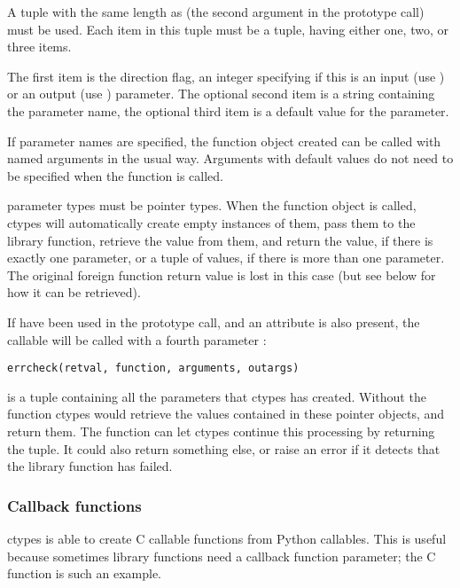 A tuple with the same length as  (the second argument in
the prototype call) must be used.  Each item in this tuple must be a
tuple, having either one, two, or three items.

The first item is the direction flag, an integer specifying if this is
an input (use ) or an output (use ) parameter.  The optional
second item is a string containing the parameter name, the optional
third item is a default value for the parameter.

If parameter names are specified, the function object created can be
called with named arguments in the usual way.  Arguments with default
values do not need to be specified when the function is called.

 parameter types must be pointer types.  When the function
object is called, ctypes will automatically create empty instances of
them, pass them to the library function, retrieve the value from them,
and return the value, if there is exactly one  parameter, or a
tuple of values, if there is more than one  parameter.  The
original foreign function return value is lost in this case (but see
below for how it can be retrieved).

If  have been used in the prototype call, and an
 attribute is also present, the  callable will
be called with a fourth parameter :
\begin{verbatim}
errcheck(retval, function, arguments, outargs)
\end{verbatim}

 is a tuple containing all the  parameters that
ctypes has created.  Without the  function ctypes would
retrieve the values contained in these pointer objects, and return
them.  The  function can let ctypes continue this
processing by returning the  tuple.  It could also return
something else, or raise an error if it detects that the library
function has failed.


\subsubsection{Callback functions\label{ctypes-callback-functions}}

ctypes is able to create C callable functions from Python callables.
This is useful because sometimes library functions need a callback
function parameter; the  C function is such an example.

